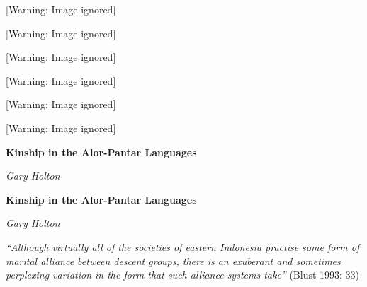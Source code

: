 \begin{center}
 [Warning: Image ignored] %

\end{center}
\begin{center}
 [Warning: Image ignored] %

\end{center}
\begin{center}
 [Warning: Image ignored] %

\end{center}
\begin{center}
 [Warning: Image ignored] %

\end{center}
\begin{center}
 [Warning: Image ignored] %

\end{center}
\begin{center}
 [Warning: Image ignored] %

\end{center}
{\centering
\textbf{Kinship in the Alor-Pantar Languages}
\par}

{\centering
\textit{Gary Holton}
\par}

\setcounter{tocdepth}{3}
\renewcommand\contentsname{}
\tableofcontents
{}

{\centering
\textbf{Kinship in the Alor-Pantar Languages}
\par}

{\centering
\textit{Gary Holton}
\par}

\textit{{\textquotedblleft}Although virtually all of the societies of eastern Indonesia practise some form of marital alliance between descent groups, there is an exuberant and sometimes perplexing variation in the form that such alliance systems take{\textquotedblright} }(Blust 1993: 33)

